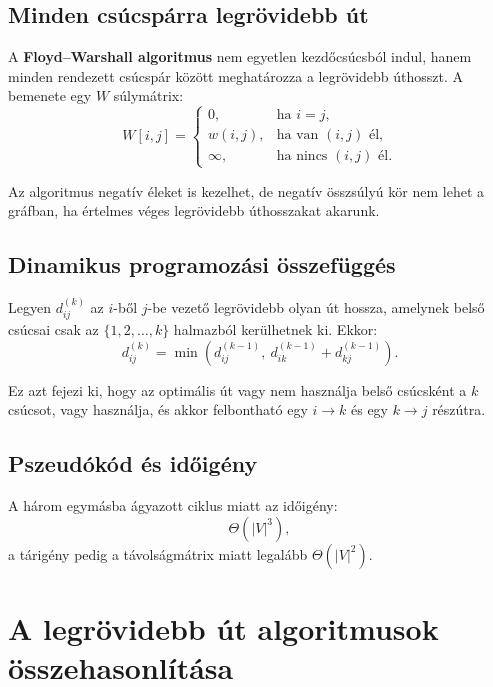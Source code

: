 \subsection{Minden csúcspárra legrövidebb út}

A \textbf{Floyd--Warshall algoritmus} nem egyetlen kezdőcsúcsból indul, hanem minden rendezett csúcspár között meghatározza a legrövidebb úthosszt. A bemenete egy $W$ súlymátrix:
\[
W[i,j]=
\begin{cases}
0, & \text{ha } i=j,\\
w(i,j), & \text{ha van }(i,j)\text{ él},\\
\infty, & \text{ha nincs }(i,j)\text{ él}.
\end{cases}
\]

Az algoritmus negatív éleket is kezelhet, de negatív összsúlyú kör nem lehet a gráfban, ha értelmes véges legrövidebb úthosszakat akarunk.

\subsection{Dinamikus programozási összefüggés}

Legyen $d_{ij}^{(k)}$ az $i$-ből $j$-be vezető legrövidebb olyan út hossza, amelynek belső csúcsai csak az $\{1,2,\dots,k\}$ halmazból kerülhetnek ki. Ekkor:
\[
d_{ij}^{(k)}=\min\left(d_{ij}^{(k-1)},\ d_{ik}^{(k-1)}+d_{kj}^{(k-1)}\right).
\]

Ez azt fejezi ki, hogy az optimális út vagy nem használja belső csúcsként a $k$ csúcsot, vagy használja, és akkor felbontható egy $i\to k$ és egy $k\to j$ részútra.



\subsection{Pszeudókód és időigény}


A három egymásba ágyazott ciklus miatt az időigény:
\[
\Theta(|V|^3),
\]
a tárigény pedig a távolságmátrix miatt legalább $\Theta(|V|^2)$.

\section{A legrövidebb út algoritmusok összehasonlítása}

